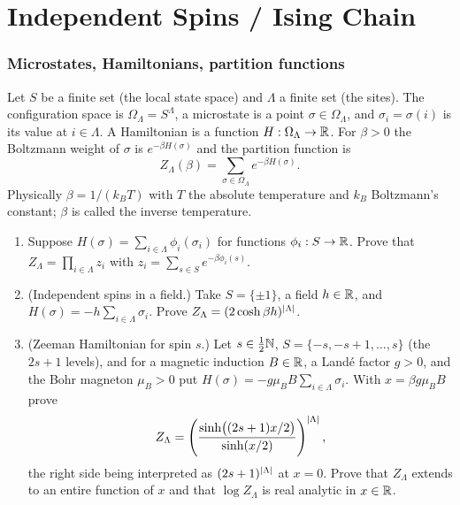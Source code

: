 \part{Independent Spins / Ising Chain}

\section{Microstates, Hamiltonians, partition functions}

\begin{exercise}
Let $S$ be a finite set (the local state space) and $\Lambda$ a finite set
(the sites).  The configuration space is $\Omega_\Lambda=S^\Lambda$, a
microstate is a point $\sigma\in\Omega_\Lambda$, and $\sigma_i=\sigma(i)$ is
its value at $i\in\Lambda$.  A Hamiltonian is a function
$H:\Omega_\Lambda\to\mathbb R$.  For $\beta>0$ the Boltzmann weight of $\sigma$ is
$e^{-\beta H(\sigma)}$ and the partition function is
\[
 Z_\Lambda(\beta)=\sum_{\sigma\in\Omega_\Lambda}e^{-\beta H(\sigma)} .
\]
Physically $\beta=1/(k_BT)$ with $T$ the absolute temperature and $k_B$
Boltzmann's constant; $\beta$ is called the inverse temperature.
\begin{enumerate}[label=(\alph*)]
\item Suppose $H(\sigma)=\sum_{i\in\Lambda}\phi_i(\sigma_i)$ for functions
$\phi_i:S\to\mathbb R$.  Prove that $Z_\Lambda=\prod_{i\in\Lambda}z_i$ with
$z_i=\sum_{s\in S}e^{-\beta\phi_i(s)}$.
\item (Independent spins in a field.)  Take $S=\{\pm1\}$, a field $h\in\mathbb R$,
and $H(\sigma)=-h\sum_{i\in\Lambda}\sigma_i$.  Prove
$Z_\Lambda=(2\cosh\beta h)^{\left\lvert \Lambda\right\rvert}$.
\item (Zeeman Hamiltonian for spin $s$.)  Let $s\in\tfrac12\mathbb N$,
$S=\{-s,-s+1,\dots,s\}$ (the $2s+1$ levels), and for a magnetic induction
$B\in\mathbb R$, a Land\'e factor $g>0$, and the Bohr magneton $\mu_B>0$ put
$H(\sigma)=-g\mu_BB\sum_{i\in\Lambda}\sigma_i$.  With $x=\beta g\mu_BB$
prove
\[
 Z_\Lambda=\left(\frac{\sinh\bigl((2s+1)x/2\bigr)}{\sinh(x/2)}\right)^{\left\lvert \Lambda\right\rvert},
\]
the right side being interpreted as $(2s+1)^{\left\lvert \Lambda\right\rvert}$ at $x=0$.  Prove
that $Z_\Lambda$ extends to an entire function of $x$ and that
$\log Z_\Lambda$ is real analytic in $x\in\mathbb R$.
\end{enumerate}
\end{exercise}


